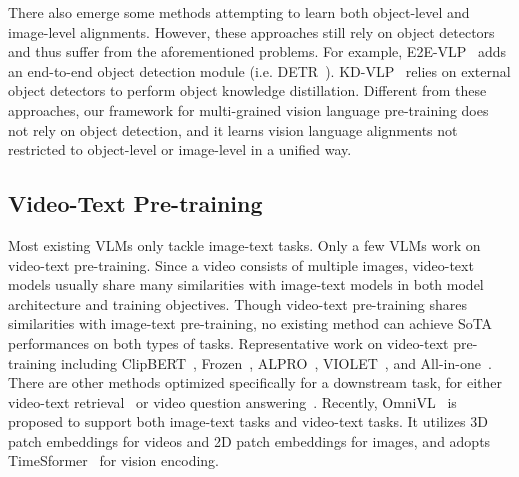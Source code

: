\documentclass{article}
\begin{document}
There also emerge some methods attempting to learn both object-level and image-level alignments. However, these approaches still rely on object detectors and thus suffer from the aforementioned problems. For example, E2E-VLP~\cite{xu2021e2e} adds an end-to-end object detection module (i.e. DETR~\cite{carion2020end}). KD-VLP~\cite{liu2021kd} relies on external object detectors to perform object knowledge distillation. Different from these approaches, our framework for multi-grained vision language pre-training does not rely on object detection, and it learns vision language alignments not restricted to object-level or image-level in a unified way. 



\subsection{Video-Text Pre-training}
Most existing VLMs only tackle image-text tasks. Only a few VLMs work on video-text pre-training. Since a video consists of multiple images, video-text models usually share many similarities with image-text models in both model architecture and training objectives. Though video-text pre-training shares similarities with image-text pre-training, no existing method can achieve SoTA performances on both types of tasks. Representative work on video-text pre-training including ClipBERT~\cite{lei2021less}, Frozen~\cite{bain2021frozen}, ALPRO~\cite{li2022align}, VIOLET~\cite{fu2021violet}, and All-in-one~\cite{wang2022all}. There are other methods optimized specifically for a downstream task, for either video-text retrieval~\cite{xue2022clip,min2022hunyuan_tvr} or video question answering~\cite{yang2022zero}. Recently, OmniVL~\cite{wang2022omnivl} is proposed to support both image-text tasks and video-text tasks. It utilizes 3D patch embeddings for videos and 2D patch embeddings for images, and adopts TimeSformer~\cite{bertasius2021space} for vision encoding. 
\end{document}

